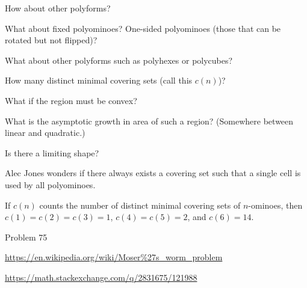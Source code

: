 \documentclass{article}
\begin{document}
\begin{related}
  \item How about other polyforms?
  \item What about fixed polyominoes? One-sided polyominoes (those that can be rotated but not flipped)?
  \item What about other polyforms such as polyhexes or polycubes?
  \item How many distinct minimal covering sets (call this $c(n)$)?
  \item What if the region must be convex?
  \item What is the asymptotic growth in area of such a region? (Somewhere between linear and quadratic.)
  \item Is there a limiting shape?
  \item Alec Jones wonders if there always exists a covering set such that a single
    cell is used by all polyominoes.
\end{related}

\begin{note}
  If $c(n)$ counts the number of distinct minimal covering sets of $n$-ominoes,
  then $c(1) = c(2) = c(3) = 1$, $c(4) = c(5) = 2$, and $c(6) = 14$.
\end{note}

\begin{references}
  \item Problem 75
  \item \url{https://en.wikipedia.org/wiki/Moser%27s_worm_problem}
  \item \url{https://math.stackexchange.com/q/2831675/121988}
\end{references}
\end{document}

